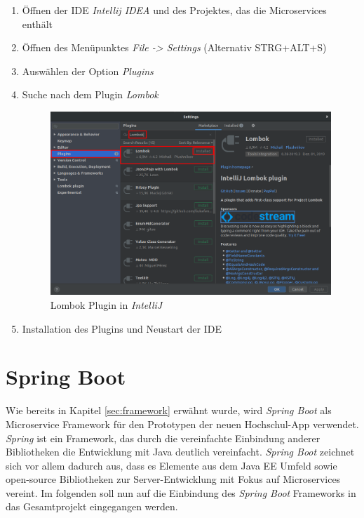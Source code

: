 \begin{enumerate}

\item Öffnen der \ac{IDE} \textit{Intellij IDEA} und des Projektes, das die Microservices enthält
\item Öffnen des Menüpunktes \textit{File -> Settings} (Alternativ \textsc{STRG+ALT+S})
\item Auswählen der Option \textit{Plugins}
\item Suche nach dem Plugin \textit{Lombok}

\begin{figure}[H]
\centering
\includegraphics[width=\pictureWidth cm]{Bilder/Kapitel_4/lombok_plugin.png}
\caption{Lombok Plugin in \textit{IntelliJ}\label{fig:lombok_plugin}}
\end{figure}

\item Installation des Plugins und Neustart der \ac{IDE}

\end{enumerate}

\section{Spring Boot}
Wie bereits in Kapitel \ref{sec:framework} erwähnt wurde, wird \textit{Spring Boot} als Microservice Framework für den Prototypen der neuen Hochschul-\ac{App} verwendet. \textit{Spring} ist ein Framework, das durch die vereinfachte Einbindung anderer Bibliotheken die Entwicklung mit Java deutlich vereinfacht\autocite[Vgl.][1]{spring}. \textit{Spring Boot} zeichnet sich vor allem dadurch aus, dass es Elemente aus dem Java \ac{EE} Umfeld sowie open-source Bibliotheken zur Server-Entwicklung mit Fokus auf Microservices vereint. Im folgenden soll nun auf die Einbindung des \textit{Spring Boot} Frameworks in das Gesamtprojekt eingegangen werden.

